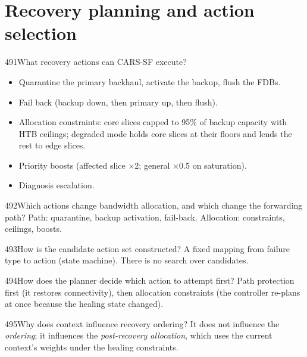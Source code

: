 \section{Recovery planning and action selection}

\begin{qa}{491}{What recovery actions can CARS-SF execute?}
\begin{itemize}
\item Quarantine the primary backhaul, activate the backup, flush the FDBs.
\item Fail back (backup down, then primary up, then flush).
\item Allocation constraints: core slices capped to 95\% of backup capacity with HTB ceilings; degraded mode holds
core slices at their floors and lends the rest to edge slices.
\item Priority boosts (affected slice $\times$2; general $\times$0.5 on saturation).
\item Diagnosis escalation.
\end{itemize}
\end{qa}

\begin{qa}{492}{Which actions change bandwidth allocation, and which change the forwarding path?}
Path: quarantine, backup activation, fail-back. Allocation: constraints, ceilings, boosts.
\end{qa}

\begin{qa}{493}{How is the candidate action set constructed?}
A fixed mapping from failure type to action (state machine). There is no search over candidates.
\end{qa}

\begin{qa}{494}{How does the planner decide which action to attempt first?}
Path protection first (it restores connectivity), then allocation constraints (the controller re-plans at once because
the healing state changed).
\end{qa}

\begin{qa}{495}{Why does context influence recovery ordering?}
It does not influence the \emph{ordering}; it influences the \emph{post-recovery allocation}, which uses the current
context's weights under the healing constraints.
\end{qa}

